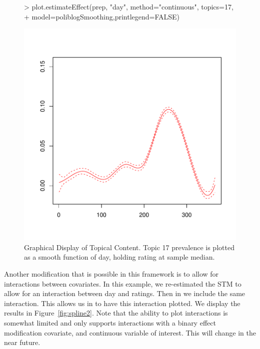\documentclass[nojss]{jss}
\begin{document}
\begin{figure}[t!]
\begin{center}
\begin{Schunk}
\begin{Sinput}
> plot.estimateEffect(prep, "day", method="continuous", topics=17,
+         model=poliblogSmoothing,printlegend=FALSE)
\end{Sinput}
\end{Schunk}
\includegraphics{stmVignette-020}
\caption{Graphical Display of Topical Content. Topic 17 prevalence is plotted as a smooth function of day, holding rating at sample median.}
\label{fig:spline}
\end{center}
\end{figure}

Another modification that is possible in this framework is to allow for interactions between covariates. In this example, we re-estimated the STM to allow for an interaction between day and ratings. Then in  we include the same interaction. This allows us in  to have this interaction plotted. We display the results in Figure~\ref{fig:spline2}. Note that the ability to plot interactions is somewhat limited and only supports interactions with a binary effect modification covariate, and continuous variable of interest. This will change in the near future.
\end{document}

